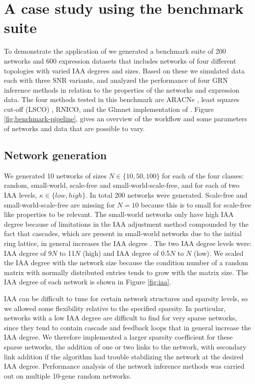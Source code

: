 \section{A case study using the benchmark suite}
\label{sec:results}
To demonstrate the application of \gs we generated a benchmark suite of 200 networks and 600 expression datasets that includes networks of four different topologies with varied IAA degrees and sizes. Based on these we simulated data each with three SNR variants, and analyzed the performance of four GRN inference methods in relation to the properties of the networks and expression data. 
The four methods tested in this benchmark are ARACNe \citep{margolin2006aracne}, least squares cut-off (LSCO) \citep{Tjarnberg2013}, RNICO, and the Glmnet implementation of \lasso \citep{Tibshirani1996,Friedman2010}.
Figure \ref{fig:benchmark-pipeline}, gives an overview of the \gs workflow and some parameters of networks and data that are possible to vary.

\subsection{Network generation}
\label{sec:network-generation}
We generated 10 networks of sizes \(N\in \{10,50,100\}\) for each of the four classes: random, small-world, scale-free and small-world-scale-free, and for each of two IAA levels, \(\kappa \in \{low,high\}\). In total 200 networks were generated. Scale-free and small-world-scale-free are missing for \(N=10\) because this is to small for scale-free like properties to be relevant. The small-world networks only have high IAA degree because of limitations in the IAA adjustment method compounded by the fact that cascades, which are present in small-world networks due to the initial ring lattice, in general increases the IAA degree \citep{Nordling2009}.
The two IAA degree levels were: IAA degree of 9$N$ to 11$N$ (high) and IAA degree of 0.5$N$ to $N$ (low).
We scaled the IAA degree with the network size because the condition number of a random matrix with normally distributed entries tends to grow with the matrix size.
The IAA degree of each network is shown in Figure \ref{fig:iaa}.

IAA can be difficult to tune for certain network structures and sparsity levels, so we
allowed some flexibility relative to the specified sparsity.
In particular, networks with a low IAA degree are difficult to find for very sparse networks, since they tend to contain cascade and feedback loops that in general increase the IAA degree. We therefore implemented a larger sparsity coefficient for these sparse networks, \ie the addition of one or two links to the network, with secondary link addition if the algorithm had trouble stabilizing the network at the desired IAA degree.
Performance analysis of the network inference methods was carried out on multiple 10-gene random networks.

